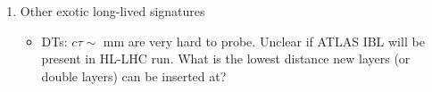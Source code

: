 \begin{enumerate}
\item Other exotic long-lived signatures
	\begin{itemize}
	\item DTs: $c \tau \sim $ mm are very hard to probe. Unclear if ATLAS IBL will be present in HL-LHC run. What is the lowest distance new layers (or double layers) can be inserted at?
	\end{itemize}	

	

\end{enumerate}


%
%
%
%
%
